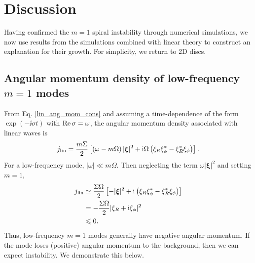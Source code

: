 \section{Discussion}\label{discussions} 
Having confirmed the $m=1$ spiral instability through numerical
simulations, we now use results from the simulations combined with
linear theory to construct an explanation for their growth. For
simplicity, we return to 2D discs. 




\subsection{Angular momentum density of  low-frequency $m=1$ modes}
From Eq. \ref{lin_ang_mom_cons} and assuming a time-dependence of the
form $\exp{(-\ii \sigma t)}$ with $\operatorname{Re}{\sigma} = \omega$,  
the angular momentum density associated with linear waves is
\begin{align}
  j_\mathrm{lin} = \frac{m\Sigma}{2}\left[\left(\omega -
      m\Omega\right)|\bm{\xi}|^2 + \mathrm{i}\Omega\left(\xi_R\xi_\phi^* -
      \xi_R^*\xi_\phi\right)\right].  
\end{align}
For a low-frequency mode, $|\omega|\ll m\Omega$. Then neglecting the
term $\omega|\bm{\xi}|^2$ and setting $m=1$,
\begin{align}
  j_\mathrm{lin} &\simeq \frac{\Sigma\Omega}{2}\left[-|\bm{\xi}|^2 + \mathrm{i}\left(\xi_R\xi_\phi^* -
      \xi_R^*\xi_\phi\right)\right]\notag\\
  & = -\frac{\Sigma\Omega}{2}|\xi_R + \mathrm{i}\xi_\phi|^2\notag\\
  & \leqslant 0.
\end{align}
Thus, low-frequency $m=1$ modes generally have negative
angular momentum. If the mode loses (positive) angular momentum
to the background, then we can expect instability. We demonstrate
this below. 

